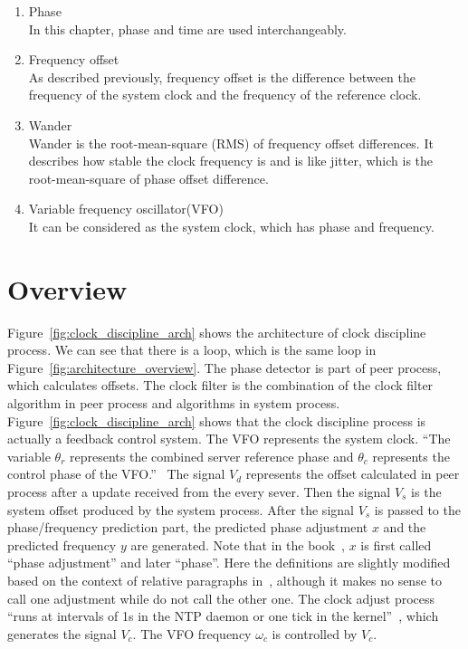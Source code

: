 \begin{enumerate}
    \item Phase\\
        In this chapter, phase and time are used interchangeably.
    \item Frequency offset\\
        As described previously, frequency offset is the difference between the
        frequency of the system clock and the frequency of the reference clock.
    \item Wander\\
        Wander is the root-mean-square (RMS) of frequency offset differences. 
        It describes how stable the clock frequency is and is like jitter,
        which is the root-mean-square of phase offset difference.
    \item Variable frequency oscillator(VFO)\\
        It can be considered as the system clock, which has phase and
        frequency.
\end{enumerate}

\section{Overview}%
\label{sec:clock_discipline_overview}
Figure~\ref{fig:clock_discipline_arch} shows the architecture of clock
discipline process. We can see that there is a loop, which is the same loop in 
Figure~\ref{fig:architecture_overview}. The phase detector is part of peer
process, which calculates offsets. The clock filter is the combination of
the clock filter algorithm in peer process and algorithms in system process.
Figure~\ref{fig:clock_discipline_arch} shows that the clock discipline process
is actually a feedback control system. The VFO represents the system clock.
``The variable $\theta_r$ represents the combined server reference phase and
$\theta_c$ represents the control phase of the VFO.''~\cite{redbook} The signal
$V_d$ represents the offset calculated in peer process after a update received
from the every sever. Then the signal $V_s$ is the system offset produced by
the system process. After the signal $V_s$ is passed to the phase/frequency
prediction part, the predicted phase adjustment $x$ and the predicted frequency
$y$ are generated. Note that in the book~\cite{redbook}, $x$ is first called
``phase adjustment'' and later ``phase''. Here the definitions are slightly
modified based on the context of relative paragraphs in~\cite{redbook},
although it makes no sense to call one adjustment while do not call the other
one. The clock adjust process ``runs at intervals of 1s in the NTP daemon or
one tick in the kernel''~\cite{redbook}, which generates the signal $V_c$. The
VFO frequency $\omega_c$ is controlled by $V_c$.

